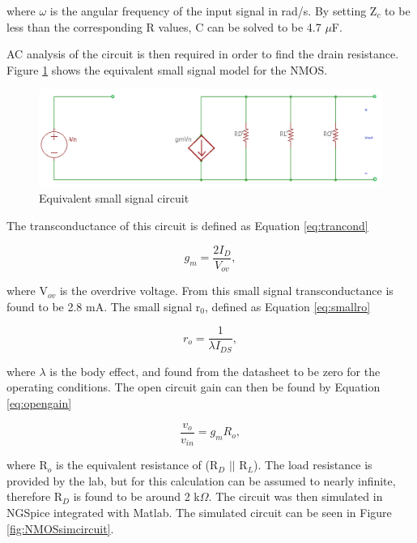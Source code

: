 	where $\omega$ is the angular frequency of the input signal in rad/s. By setting Z$_c$ to be less than the corresponding R values, C can be solved to be 4.7 $\mu$F.
	
	
	 AC analysis of the circuit is then required in order to find the drain resistance. Figure \ref{fig:smallsignalnmos} shows the equivalent small signal model for the NMOS.
	
	
	\begin{figure}[H]
		\centering
		\includegraphics[width=.55\textwidth]{CircuitDevelopment/smallsignal.png}
		\caption{Equivalent small signal circuit}
		\label{fig:smallsignalnmos}
	\end{figure}
	
	The transconductance of this circuit is defined as Equation \ref{eq:trancond}
	
	\begin{equation}\label{eq:trancond}
	g_m = \frac{2I_D}{V_{ov}},
	\end{equation}
	
	where V$_{ov}$ is the overdrive voltage. From this small signal transconductance is found to be 2.8 mA. The small signal r$_0$, defined as Equation \ref{eq:smallro}
	
	\begin{equation}\label{eq:smallro}	
	r_o = \frac{1}{\lambda I_{DS}},	
	\end{equation}
	
	where $\lambda$ is the body effect, and found from the datasheet \cite{NMOS} to be zero for the operating conditions. The open circuit gain can then be found by Equation \ref{eq:opengain} 
	
	\begin{equation}\label{eq:opengain}
	\frac{v_o}{v_{in}} = g_mR_o,
	\end{equation}
	
	where R$_o$ is the equivalent resistance of (R$_D$ $||$ R$_L$). The load resistance is provided by the lab, but for this calculation can be assumed to nearly infinite, therefore R$_D$ is found to be around 2 k$\Omega$. The circuit was then simulated in NGSpice integrated with Matlab. The simulated circuit can be seen in Figure \ref{fig:NMOSsimcircuit}.
	
